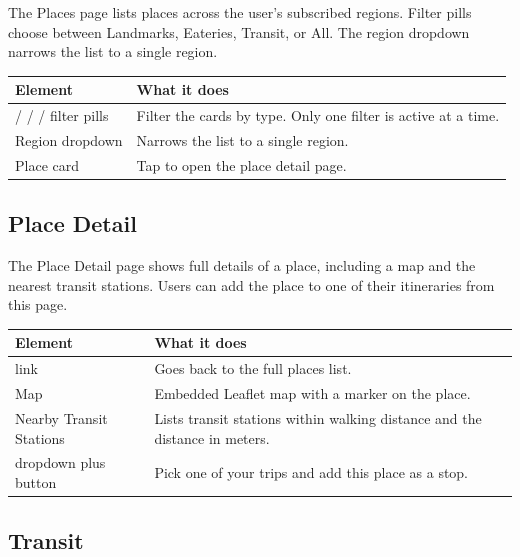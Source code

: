 \documentclass[11pt,letterpaper]{article}
\let\oldtexttt\texttt
\renewcommand{\texttt}[1]{{\color{inlinecode}\oldtexttt{#1}}}
\begin{document}
The Places page lists places across the user's subscribed regions. Filter pills choose between Landmarks, Eateries, Transit, or All. The region dropdown narrows the list to a single region.

\begin{table}[H]
    \centering
    \begin{tabularx}{\textwidth}{lX}
        \toprule
        \textbf{Element} & \textbf{What it does} \\
        \midrule
        \texttt{Landmarks} / \texttt{Eateries} / \texttt{Transit} / \texttt{All} filter pills & Filter the cards by type. Only one filter is active at a time. \\
        Region dropdown & Narrows the list to a single region. \\
        Place card & Tap to open the place detail page. \\
        \bottomrule
    \end{tabularx}
\end{table}

\subsection{Place Detail}

The Place Detail page shows full details of a place, including a map and the nearest transit stations. Users can add the place to one of their itineraries from this page.

\begin{table}[H]
    \centering
    \begin{tabularx}{\textwidth}{lX}
        \toprule
        \textbf{Element} & \textbf{What it does} \\
        \midrule
        \texttt{Back to Places} link & Goes back to the full places list. \\
        Map & Embedded Leaflet map with a marker on the place. \\
        Nearby Transit Stations & Lists transit stations within walking distance and the distance in meters. \\
        \texttt{Add to Itinerary} dropdown plus \texttt{Add} button & Pick one of your trips and add this place as a stop. \\
        \bottomrule
    \end{tabularx}
\end{table}

\subsection{Transit}
\end{document}
